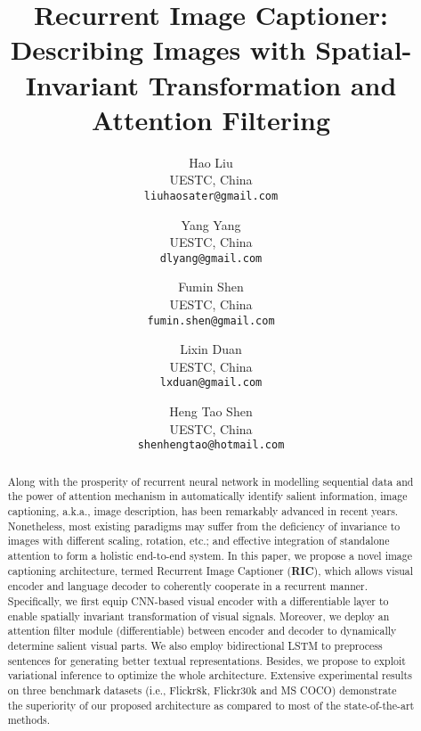 \documentclass[10pt,twocolumn,letterpaper]{article}
\begin{document}
	
	\title{Recurrent Image Captioner: Describing Images with Spatial-Invariant Transformation and Attention Filtering
	}
	
	\author{Hao Liu\\
		UESTC, China\\
		{\tt\small liuhaosater@gmail.com}
		\and
		Yang Yang\\
		UESTC, China\\
		{\tt\small dlyang@gmail.com}
		\and
		Fumin Shen\\
		UESTC, China\\
		{\tt\small fumin.shen@gmail.com}
		\and
		Lixin Duan\\
		UESTC, China\\
		{\tt\small lxduan@gmail.com}
		\and
		Heng Tao Shen\\
		UESTC, China\\
		{\tt \small shenhengtao@hotmail.com}
	}
	
	\maketitle
	
	\begin{abstract}
		Along with the prosperity of recurrent neural network in modelling sequential data and the power of attention mechanism in automatically identify salient information, image captioning, a.k.a., image description, has been remarkably advanced in recent years. Nonetheless, most existing paradigms may suffer from the deficiency of invariance to images with different scaling, rotation, etc.; and effective integration of standalone attention to form a holistic end-to-end system. In this paper, we propose a novel image captioning architecture, termed Recurrent Image Captioner (\textbf{RIC}), which allows visual encoder and language decoder to coherently cooperate in a recurrent manner. Specifically, we first equip CNN-based visual encoder with a differentiable layer to enable spatially invariant transformation of visual signals. Moreover, we deploy an attention filter module (differentiable) between encoder and decoder to dynamically determine salient visual parts. We also employ bidirectional LSTM to preprocess sentences for generating better textual representations. Besides, we propose to exploit variational inference to optimize the whole architecture. Extensive experimental results on three benchmark datasets (i.e., Flickr8k, Flickr30k and MS COCO) demonstrate the superiority of our proposed architecture as compared to most of the state-of-the-art methods.
	\end{abstract}
	
\end{document}
